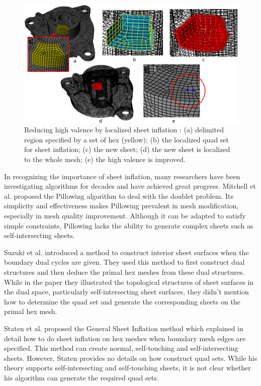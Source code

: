 \documentclass[final,5p,times,twocolumn]{elsarticle}
\begin{document}
\begin{figure}[htbp]
\begin{center}
\includegraphics[width=15cm]{intro_high_val_localized_inf.png}
\caption{Reducing high valence by localized sheet inflation : (a) delimited region specified by a set of hex (yellow); (b) the localized quad set for sheet inflation; (c) the new sheet; (d) the new sheet is localized to the whole mesh; (e) the high valence is improved.}
\label{fig:intro_high_val_localized_inf}
\end{center}
\end{figure}

In recognizing the importance of sheet inflation, many researchers have been investigating algorithms for decades and have achieved great progress. Mitchell et al. proposed the Pillowing algorithm to deal with the doublet problem\cite{Mitchell:1995wa}.  Its simplicity and effectiveness makes Pillowing prevalent in mesh modification, especially in mesh quality improvement. Although it can be adapted to satisfy simple constraints, Pillowing lacks the ability to generate complex sheets such as self-intersecting sheets.

Suzuki et al. introduced a method to construct interior sheet surfaces when the boundary dual cycles are given\cite{Suzuki:2010hn}. They used this method to first construct dual structures and then deduce the primal hex meshes from these dual structures. While in the paper they illustrated the topological structures of sheet surfaces in the dual space, particularly self-intersecting sheet surfaces, they didn't mention how to determine the quad set and generate the corresponding sheets on the primal hex mesh.

Staten et al. proposed the General Sheet Inflation method which explained in detail how to do sheet inflation on hex meshes when boundary mesh edges are specified\cite{Staten:2009bo}. This method can create normal, self-touching and self-intersecting sheets. However, Staten provides no details on how construct quad sets.  While his theory supports self-intersecting and self-touching sheets, it is not clear whether his algorithm can generate the required quad sets.
\end{document}
